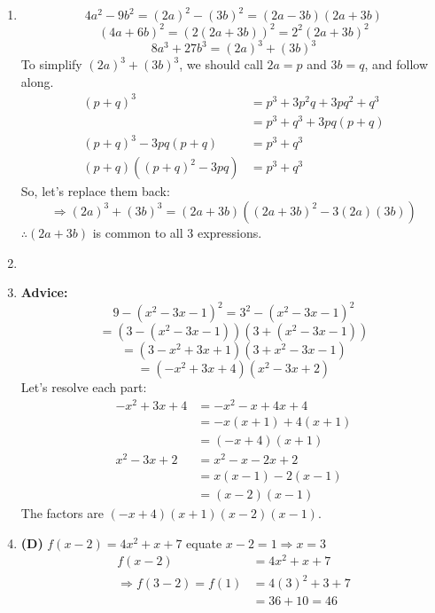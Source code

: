 \begin{multicols}{2}
\begin{enumerate}[label={\textbf{\arabic*.}}]
    \item 
    \[4a^2 - 9b^2 = (2a)^2 - (3b)^2 = (2a - 3b)(2a + 3b)\]
    \[(4a + 6b)^2 = \left(2(2a + 3b)\right)^2 = 2^2 (2a + 3b)^2\]
    \[ 8a^3 + 27b^3 = (2a)^3 + (3b)^3 \]
    To simplify \( (2a)^3 + (3b)^3 \), we should call \( 2a = p \) and \( 3b = q \), and follow along.
    \begin{align*}
        (p + q)^3 &= p^3 + 3p^2q + 3pq^2 + q^3 \\
        &= p^3 + q^3 + 3pq(p + q) \\
        (p + q)^3 - 3pq(p + q) &= p^3 + q^3 \\
        (p + q)((p + q)^2 - 3pq) &= p^3 + q^3
    \end{align*}
    So, let's replace them back:
    \[\Rightarrow (2a)^3 + (3b)^3 = (2a + 3b)\left((2a + 3b)^2 - 3(2a)(3b)\right)\]
    \(\therefore (2a + 3b)\) is common to all 3 expressions.

    \item
    \item \textbf{Advice:} 
    \[ 9 - (x^2 - 3x - 1)^2 = 3^2 - (x^2 - 3x - 1)^2\]  
    \[ = (3 - (x^2 - 3x - 1))(3 + (x^2 - 3x - 1))\]
    \[ = (3 - x^2 + 3x + 1)(3 + x^2 - 3x - 1) \]
    \[= (-x^2 + 3x + 4)(x^2 - 3x + 2)\]
    Let's resolve each part:
    \begin{align*}
    -x^2 + 3x + 4 &= -x^2 - x + 4x + 4 \\
    &= -x(x + 1) + 4(x + 1) \\
    &= (-x + 4)(x + 1)\\
    x^2 - 3x + 2 &= x^2 - x - 2x + 2 \\
    &= x(x - 1) - 2(x - 1) \\
    &= (x - 2)(x - 1)
    \end{align*}
    The factors are \((-x + 4)(x + 1)(x - 2)(x - 1)\).

    \item \textbf{(D)} $f(x - 2) = 4x^2 + x + 7 $ equate $x - 2 = 1 \Rightarrow x = 3$ 
    \begin{align*} 
        f(x - 2) &= 4x^2 + x + 7 \\
        \Rightarrow  f(3 - 2) = f(1) &= 4(3)^2 + 3 + 7 \\
        & = 36 + 10 = 46
    \end{align*}


\end{enumerate}
\end{multicols}
